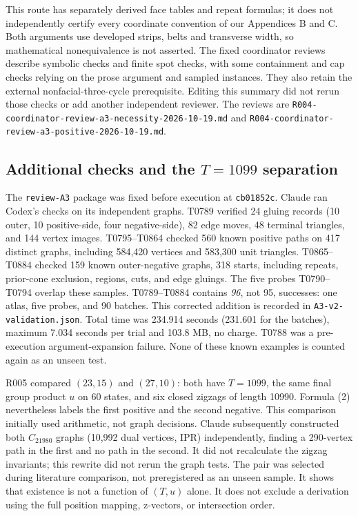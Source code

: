 \documentclass[11pt]{amsart}
\newcommand{\record}[1]{\nolinkurl{#1}}
\begin{document}
This route has separately derived face tables and repeat formulas;
it does not independently certify every coordinate convention of our
Appendices B and C. Both arguments use developed strips, belts and
transverse width, so mathematical nonequivalence is not asserted.
The fixed coordinator reviews describe symbolic checks and finite
spot checks, with some containment and cap checks relying on the
prose argument and sampled instances. They also retain the external
nonfacial-three-cycle prerequisite. Editing this summary did not rerun
those checks or add another independent reviewer. The reviews are
\record{R004-coordinator-review-a3-necessity-2026-10-19.md} and
\record{R004-coordinator-review-a3-positive-2026-10-19.md}.

\subsection{Additional checks and the \texorpdfstring{$T=1099$}{T=1099} separation}
The \record{review-A3} package was fixed before execution at
\record{cb01852c}. Claude ran Codex's checks on its independent graphs.
T0789 verified 24 gluing records (10 outer, 10 positive-side, four
negative-side), 82 edge moves, 48 terminal triangles, and 144 vertex
images. T0795--T0864 checked 560 known positive paths on 417 distinct
graphs, including 584,420 vertices and 583,300 unit triangles.
T0865--T0884 checked 159 known outer-negative graphs, 318 starts,
including repeats, prior-cone exclusion, regions, cuts, and edge gluings.
The five probes T0790--T0794 overlap these samples. T0789--T0884
contains \emph{96}, not 95, successes: one atlas, five probes, and
90 batches. This corrected addition is recorded in
\record{A3-v2-validation.json}. Total time was 234.914 seconds (231.601
for the batches), maximum 7.034 seconds per trial and 103.8 MB, no
charge. T0788 was a pre-execution argument-expansion failure. None of
these known examples is counted again as an unseen test.

R005 compared $(23,15)$ and $(27,10)$: both have $T=1099$, the same
final group product $u$ on 60 states, and six closed zigzags of length
10990. Formula (2) nevertheless labels the first positive and the
second negative. This comparison initially used arithmetic, not graph
decisions. Claude subsequently constructed both $C_{21980}$ graphs
(10,992 dual vertices, IPR) independently, finding a 290-vertex path
in the first and no path in the second. It did not recalculate the
zigzag invariants; this rewrite did not rerun the graph tests.
The pair was selected during literature comparison, not preregistered
as an unseen sample. It shows that existence is not a function of
$(T,u)$ alone. It does not exclude a derivation using the full position
mapping, z-vectors, or intersection order.
\end{document}
